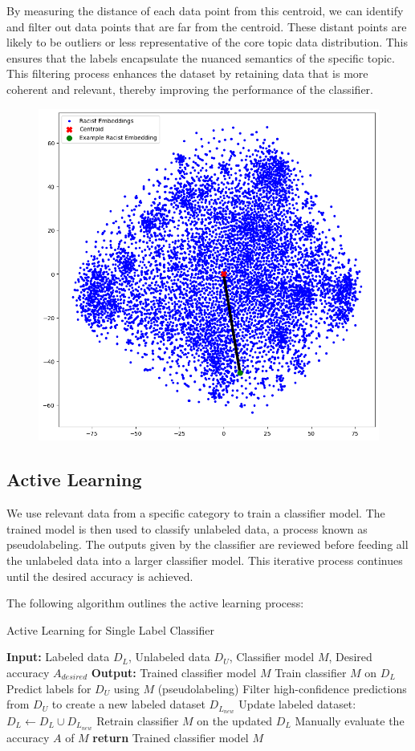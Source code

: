 \documentclass[preprint]{article}
\begin{document}
By measuring the distance of each data point from this centroid, we can identify and filter out data points that are far from the centroid. These distant points are likely to be outliers or less representative of the core topic data distribution. This ensures that the labels encapsulate the nuanced semantics of the specific topic. This filtering process enhances the dataset by retaining data that is more coherent and relevant, thereby improving the performance of the classifier.

\begin{figure}[h]
  \centering
  \includegraphics[width=0.6\linewidth]{img/centroid-distance.png}
\end{figure}

\subsection{Active Learning}

We use relevant data from a specific category to train a classifier model. The trained model is then used to classify unlabeled data, a process known as pseudolabeling. The outputs given by the classifier are reviewed before feeding all the unlabeled data into a larger classifier model. This iterative process continues until the desired accuracy is achieved.

The following algorithm outlines the active learning process:

\begin{algorithm}[H]
  \caption{Active Learning for Single Label Classifier}
  \begin{algorithmic}[1]
  \State \textbf{Input:} Labeled data \(D_L\), Unlabeled data \(D_U\), Classifier model \(M\), Desired accuracy \(A_{desired}\)
  \State \textbf{Output:} Trained classifier model \(M\)
      \State Train classifier \(M\) on \(D_L\)
      \State Predict labels for \(D_U\) using \(M\) (pseudolabeling)
      \State Filter high-confidence predictions from \(D_U\) to create a new labeled dataset \(D_{L_{new}}\)
      \State Update labeled dataset: \(D_L \leftarrow D_L \cup D_{L_{new}}\)
      \State Retrain classifier \(M\) on the updated \(D_L\)
      \State Manually evaluate the accuracy \(A\) of \(M\)
      \EndWhile
  \State \textbf{return} Trained classifier model \(M\)
  \end{algorithmic}
  \end{algorithm}
\end{document}
